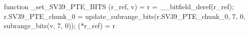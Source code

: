 function _set_SV39_PTE_BITS (r_ref, v) = {
    r = __bitfield_deref(r_ref);
    r.SV39_PTE_chunk_0 = update_subrange_bits(r.SV39_PTE_chunk_0, 7, 0, subrange_bits(v, 7, 0));
    (*r_ref) = r
}
